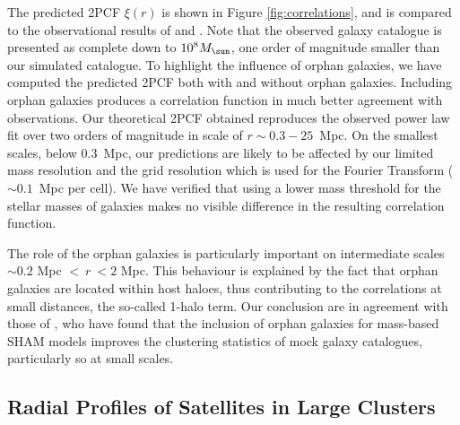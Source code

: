 The predicted 2PCF $\xi(r)$ is shown in Figure \ref{fig:correlations},
and is  compared to  the observational  results of  \cite{LiWhite} and
\cite{Correlation1}.   Note  that  the observed  galaxy  catalogue  is
presented as  complete down  to $10^8 \msol$,  one order  of magnitude
smaller than our  simulated catalogue.  To highlight  the influence of
orphan galaxies,  we have  computed the predicted  2PCF both  with and
without  orphan  galaxies.   Including   orphan  galaxies  produces  a
correlation function in much  better agreement with observations.  Our
theoretical 2PCF obtained  reproduces the observed power  law fit over
two orders  of magnitude  in scale  of $r\sim 0.3  - 25$~Mpc.   On the
smallest  scales, below  0.3~Mpc,  our predictions  are  likely to  be
affected by our limited mass resolution and the grid resolution which 
is used for the Fourier Transform ($\sim 0.1$~Mpc per cell). We have 
verified that using a lower mass threshold for the stellar masses of 
galaxies makes no visible difference in the resulting correlation function.

The  role  of  the  orphan   galaxies  is  particularly  important  on
intermediate scales $\sim  0.2$ Mpc $<\ r \ <  2$ Mpc.  This behaviour
is explained by the fact that  orphan galaxies are located within host
haloes, thus contributing to the  correlations at small distances, the
so-called 1-halo term.  Our conclusion are in agreement  with those of
\cite{crisis}, who  have found that  the inclusion of  orphan galaxies
for mass-based SHAM models improves  the clustering statistics of mock
galaxy catalogues, particularly so at small scales.

\subsection{Radial Profiles of Satellites in Large Clusters}\label{chap:radial-profiles}


